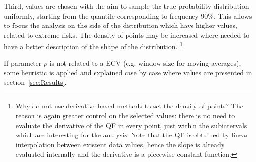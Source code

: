 Third, values are chosen with the aim to sample the true probability distribution uniformly, starting from the quantile corresponding to frequency 90\%. This allows to focus the analysis on the side of the distribution which have higher values, related to extreme \glspl{risk}. The density of points may be increased where needed to have a better description of the shape of the distribution.%
\footnote{Why do not use derivative-based methods to set the density of points? The reason is again greater control on the selected values: there is no need to evaluate the derivative of the \gls{QF} in every point, just within the subintervals which are interesting for the analysis. Note that the \gls{QF} is obtained by linear interpolation between existent data values, hence the slope is already evaluated internally and the derivative is a piecewise constant function.}

If parameter $p$ is not related to a \gls{ECV} (e.g. window size for moving averages), some heuristic is applied and explained case by case where values are presented in section~\ref{sec:Results}.

